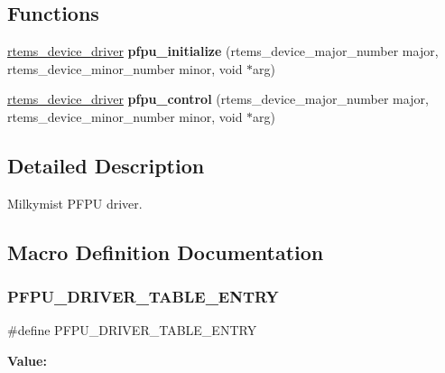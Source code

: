 \subsection*{Functions}
\begin{DoxyCompactItemize}
\item 
\mbox{\label{group__lm32__milkymist__pfpu_gaeb3cfeb7abc4c06c62957109328785ba}} 
\mbox{\hyperlink{group__ClassicStatus_ga545d41846817eaba6143d52ee4d9e9fe}{rtems\+\_\+device\+\_\+driver}} {\bfseries pfpu\+\_\+initialize} (rtems\+\_\+device\+\_\+major\+\_\+number major, rtems\+\_\+device\+\_\+minor\+\_\+number minor, void $\ast$arg)
\item 
\mbox{\label{group__lm32__milkymist__pfpu_ga8d68df518e55da2c793d61ca803507bb}} 
\mbox{\hyperlink{group__ClassicStatus_ga545d41846817eaba6143d52ee4d9e9fe}{rtems\+\_\+device\+\_\+driver}} {\bfseries pfpu\+\_\+control} (rtems\+\_\+device\+\_\+major\+\_\+number major, rtems\+\_\+device\+\_\+minor\+\_\+number minor, void $\ast$arg)
\end{DoxyCompactItemize}


\subsection{Detailed Description}
Milkymist P\+F\+PU driver. 



\subsection{Macro Definition Documentation}
\mbox{\label{group__lm32__milkymist__pfpu_gaf6321b67edbedc17872cd898817ed29b}} 
\subsubsection{\texorpdfstring{PFPU\_DRIVER\_TABLE\_ENTRY}{PFPU\_DRIVER\_TABLE\_ENTRY}}
{\footnotesize\ttfamily \#define P\+F\+P\+U\+\_\+\+D\+R\+I\+V\+E\+R\+\_\+\+T\+A\+B\+L\+E\+\_\+\+E\+N\+T\+RY}

{\bfseries Value\+:}
\begin{DoxyCode}{0}

\end{DoxyCode}
